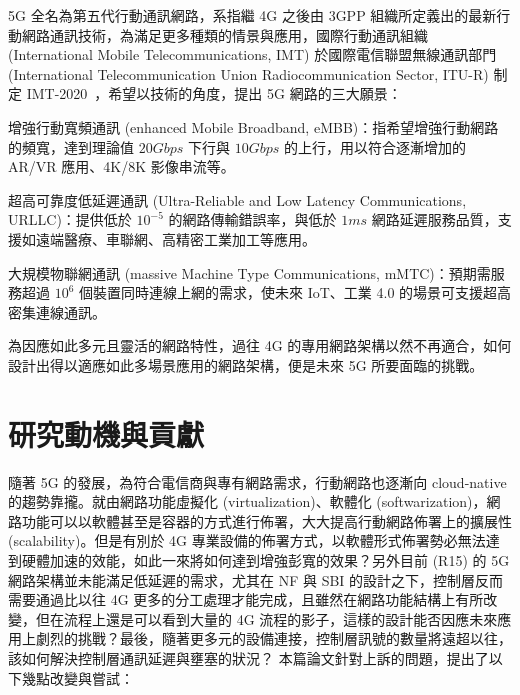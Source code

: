5G 全名為第五代行動通訊網路，系指繼 4G 之後由 3GPP 組織所定義出的最新行動網路通訊技術，為滿足更多種類的情景與應用，國際行動通訊組織 (International Mobile Telecommunications, IMT) 於國際電信聯盟無線通訊部門 (International Telecommunication Union Radiocommunication Sector, ITU-R) 制定 IMT-2020~\cite{IMT_2020}，希望以技術的角度，提出 5G 網路的三大願景：
\begin{enumerate*}
\item 增強行動寬頻通訊 (enhanced Mobile Broadband, eMBB)：指希望增強行動網路的頻寬，達到理論值 $20 Gbps$ 下行與 $10 Gbps$ 的上行，用以符合逐漸增加的 AR/VR 應用、4K/8K 影像串流等。
\item 超高可靠度低延遲通訊 (Ultra-Reliable and Low Latency Communications, URLLC)：提供低於 $10^{-5}$ 的網路傳輸錯誤率，與低於 $1 ms$ 網路延遲服務品質，支援如遠端醫療、車聯網、高精密工業加工等應用。
\item 大規模物聯網通訊 (massive Machine Type Communications, mMTC)：預期需服務超過 $10^{6}$ 個裝置同時連線上網的需求，使未來 IoT、工業 4.0 的場景可支援超高密集連線通訊。
\end{enumerate*}

為因應如此多元且靈活的網路特性，過往 4G 的專用網路架構以然不再適合，如何設計出得以適應如此多場景應用的網路架構，便是未來 5G 所要面臨的挑戰。

\section{研究動機與貢獻}
\label{sec:motivation_and_contribution}
隨著 5G 的發展，為符合電信商與專有網路需求，行動網路也逐漸向 cloud-native 的趨勢靠攏。就由網路功能虛擬化 (virtualization)、軟體化 (softwarization)，網路功能可以以軟體甚至是容器的方式進行佈署，大大提高行動網路佈署上的擴展性 (scalability)。但是有別於 4G 專業設備的佈署方式，以軟體形式佈署勢必無法達到硬體加速的效能，如此一來將如何達到增強彭寬的效果？另外目前 (R15) 的 5G 網路架構並未能滿足低延遲的需求，尤其在 NF 與 SBI 的設計之下，控制層反而需要通過比以往 4G 更多的分工處理才能完成，且雖然在網路功能結構上有所改變，但在流程上還是可以看到大量的 4G 流程的影子，這樣的設計能否因應未來應用上劇烈的挑戰？最後，隨著更多元的設備連接，控制層訊號的數量將遠超以往，該如何解決控制層通訊延遲與壅塞的狀況？
本篇論文針對上訴的問題，提出了以下幾點改變與嘗試：

